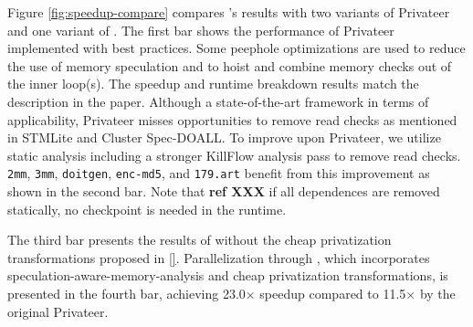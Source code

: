 Figure \ref{fig:speedup-compare} compares \namensp's results
 with two
variants of Privateer and one variant of \namensp. The first bar shows the
performance of Privateer implemented with best practices.
Some peephole optimizations are used to reduce the use of memory
speculation and to hoist and combine memory checks out of the inner loop(s).
The speedup and runtime breakdown results match the description in the paper.
Although a state-of-the-art framework in terms of applicability, Privateer
misses opportunities to remove read checks as mentioned in
STMLite\cite{mehrara:09:stmlite} and Cluster Spec-DOALL\cite{kim:12:cgo}. To
improve upon Privateer, we utilize static analysis
including a stronger KillFlow analysis pass to remove read checks.
\texttt{2mm}, \texttt{3mm}, \texttt{doitgen}, \texttt{enc-md5}, and
\texttt{179.art} benefit from this improvement as shown in the second bar.
Note that \textbf{ref XXX} if all dependences are removed statically, no
checkpoint is needed in the runtime.

The third bar presents the results of \name without the cheap
privatization transformations proposed in \ref{}. Parallelization through
\name, which incorporates speculation-aware-memory-analysis and cheap
privatization transformations, is presented in the fourth bar, achieving
23.0$\times$ speedup compared to 11.5$\times$ by the original Privateer.







